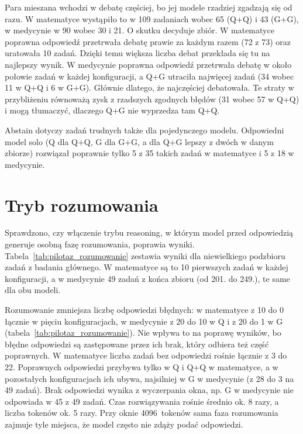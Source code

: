 Para mieszana wchodzi w debatę częściej, bo jej modele rzadziej zgadzają się od razu. W matematyce wystąpiło to w 109 zadaniach wobec 65 (Q+Q) i 43 (G+G), w medycynie w 90 wobec 30 i 21. O skutku decyduje zbiór. W matematyce poprawna odpowiedź przetrwała debatę prawie za każdym razem (72 z 73) oraz uratowała 10 zadań. Dzięki temu większa liczba debat przekłada się tu na najlepszy wynik. W medycynie poprawna odpowiedź przetrwała debatę w około połowie zadań w każdej konfiguracji, a Q+G utraciła najwięcej zadań (34 wobec 11 w Q+Q i 6 w G+G). Głównie dlatego, że najczęściej debatowała. Te straty w przybliżeniu równoważą zysk z rzadszych zgodnych błędów (31 wobec 57 w Q+Q) i mogą tłumaczyć, dlaczego Q+G nie wyprzedza tam Q+Q.

Abstain dotyczy zadań trudnych także dla pojedynczego modelu. Odpowiedni model solo (Q dla Q+Q, G dla G+G, a dla Q+G lepszy z dwóch w danym zbiorze) rozwiązał poprawnie tylko 5 z 35 takich zadań w matematyce i 5 z 18 w medycynie.

\section{Tryb rozumowania}
\label{sec:rozumowanie}

Sprawdzono, czy włączenie trybu reasoning, w którym model przed odpowiedzią generuje osobną fazę rozumowania, poprawia wyniki. Tabela~\ref{tab:pilotaz_rozumowanie} zestawia wyniki dla niewielkiego podzbioru zadań z badania głównego. W matematyce są to 10 pierwszych zadań w każdej konfiguracji, a w medycynie 49 zadań z końca zbioru (od 201. do 249.), te same dla obu modeli.



Rozumowanie zmniejsza liczbę odpowiedzi błędnych: w matematyce z 10 do 0 łącznie w pięciu konfiguracjach, w medycynie z 20 do 10 w Q i z 20 do 1 w G (tabela~\ref{tab:pilotaz_rozumowanie}). Nie wpływa to na poprawę wyników, bo błędne odpowiedzi są zastępowane przez ich brak, który odbiera też część poprawnych. W matematyce liczba zadań bez odpowiedzi rośnie łącznie z 3 do 22. Poprawnych odpowiedzi przybywa tylko w Q i Q+Q w matematyce, a w pozostałych konfiguracjach ich ubywa, najsilniej w G w medycynie (z 28 do 3 na 49 zadań). Brak odpowiedzi wynika z wyczerpania okna, np. G w medycynie nie odpowiada w 45 z 49 zadań. Czas rozwiązywania rośnie średnio ok. 8 razy, a liczba tokenów ok. 5 razy. Przy oknie 4096~tokenów sama faza rozumowania zajmuje tyle miejsca, że model często nie zdąży podać odpowiedzi.

